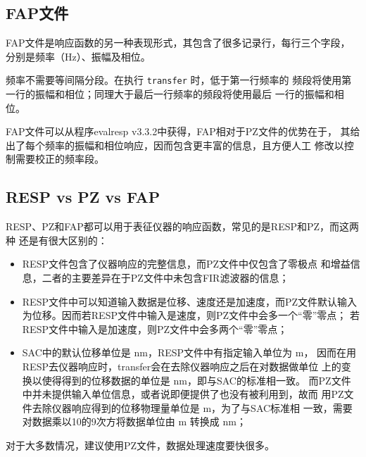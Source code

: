 \subsection{FAP文件}
FAP文件是响应函数的另一种表现形式，其包含了很多记录行，每行三个字段，
分别是频率（\si{Hz}）、振幅及相位。

频率不需要等间隔分段。在执行 \texttt{transfer} 时，低于第一行频率的
频段将使用第一行的振幅和相位；同理大于最后一行频率的频段将使用最后
一行的振幅和相位。

FAP文件可以从程序evalresp v3.3.2中获得，FAP相对于PZ文件的优势在于，
其给出了每个频率的振幅和相位响应，因而包含更丰富的信息，且方便人工
修改以控制需要校正的频率段。

\subsection{RESP vs PZ vs FAP}
RESP、PZ和FAP都可以用于表征仪器的响应函数，常见的是RESP和PZ，而这两种
还是有很大区别的：
\begin{itemize}
\item RESP文件包含了仪器响应的完整信息，而PZ文件中仅包含了零极点
    和增益信息，二者的主要差异在于PZ文件中未包含FIR滤波器的信息；
\item RESP文件中可以知道输入数据是位移、速度还是加速度，而PZ文件默认输入
    为位移。因而若RESP文件中输入是速度，则PZ文件中会多一个``零''零点；
    若RESP文件中输入是加速度，则PZ文件中会多两个``零''零点；
\item SAC中的默认位移单位是 \si{\nm}，RESP文件中有指定输入单位为 \si{\m}，
    因而在用RESP去仪器响应时，transfer会在去除仪器响应之后在对数据做单位
    上的变换以使得得到的位移数据的单位是 \si{\nm}，即与SAC的标准相一致。
    而PZ文件中并未提供输入单位信息，或者说即便提供了也没有被利用到，故而
    用PZ文件去除仪器响应得到的位移物理量单位是 \si{\m}，为了与SAC标准相
    一致，需要对数据乘以10的9次方将数据单位由 \si{\m} 转换成 \si{\nm}；
\end{itemize}

对于大多数情况，建议使用PZ文件，数据处理速度要快很多。
